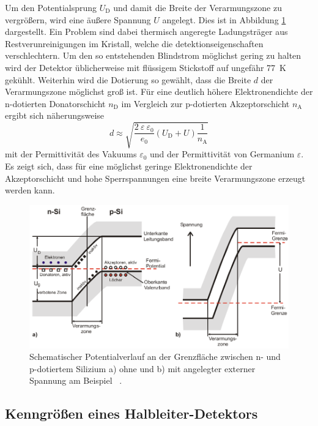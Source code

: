 Um den Potentialsprung $U_\text{D}$ und damit die Breite der Verarmungszone zu vergrößern,
wird eine äußere Spannung $U$ angelegt.
Dies ist in Abbildung \ref{fig:SchematischerPotentialverlauf} dargestellt.
Ein Problem sind dabei thermisch angeregte Ladungsträger aus Restverunreinigungen im Kristall,
welche die detektionseigenschaften verschlechtern.
Um den so entstehenden Blindstrom möglichst gering zu halten wird der
Detektor üblicherweise mit flüssigem Stickstoff auf ungefähr \SI{77}{\kelvin} gekühlt.
Weiterhin wird die Dotierung so gewählt, dass die Breite $d$ der Verarmungszone möglichst groß ist.
Für eine deutlich höhere Elektronendichte der n-dotierten Donatorschicht $n_\text{D}$ im
Vergleich zur p-dotierten Akzeptorschicht $n_\text{A}$ ergibt sich näherungsweise
\begin{equation}
	d \approx \sqrt{\frac{2\:\varepsilon\:\varepsilon_0}{e_0} \left(U_\text{D} + U\right) \frac{1}{n_\text{A}}}
	\label{eqn:BreiteVerarmungszone}
\end{equation}
mit der Permittivität des Vakuums $\varepsilon_0$ und der Permittivität von Germanium $\varepsilon$.
Es zeigt sich, dass für eine möglichst geringe Elektronendichte der Akzeptorschicht und hohe
Sperrspannungen eine breite Verarmungszone erzeugt werden kann.
\begin{figure}
	\centering
	\includegraphics[width=\textwidth]{images/Schematischer-Potentialverlauf.pdf}
	\caption{Schematischer Potentialverlauf an der Grenzfläche zwischen n- und p-dotiertem
	Silizium a) ohne und b) mit angelegter externer Spannung am Beispiel ~\cite[12]{anleitung}.}
	\label{fig:SchematischerPotentialverlauf}
\end{figure}

\subsection{Kenngrößen eines Halbleiter-Detektors}
\label{sec:KenngroessenHLDetektor}

